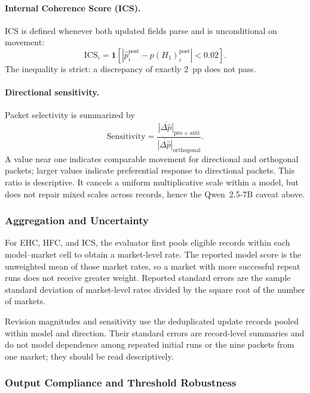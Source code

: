 \paragraph{Internal Coherence Score (ICS).}
ICS is defined whenever both updated fields parse and is unconditional on movement:
\begin{equation}
  \mathrm{ICS}_i=\mathbf{1}\!\left[
  \left|\hat p_i^{\mathrm{post}}-p(H_1)_i^{\mathrm{post}}\right|<0.02\right].
  \label{eq:ics}
\end{equation}
The inequality is strict: a discrepancy of exactly 2~pp does not pass.

\paragraph{Directional sensitivity.}
Packet selectivity is summarized by
\begin{equation}
  \mathrm{Sensitivity}=
  \frac{\overline{|\Delta\hat p|}_{\mathrm{pro}+\mathrm{anti}}}
       {\overline{|\Delta\hat p|}_{\mathrm{orthogonal}}}.
  \label{eq:sensitivity}
\end{equation}
A value near one indicates comparable movement for directional and orthogonal
packets; larger values indicate preferential response to directional packets. This
ratio is descriptive.  It cancels a uniform multiplicative scale within a model, but
does not repair mixed scales across records, hence the Qwen~2.5-7B caveat above.

\subsubsection{Aggregation and Uncertainty}
\label{app:aggregation}

For EHC, HFC, and ICS, the evaluator first pools eligible records within each
model--market cell to obtain a market-level rate.  The reported model score is the
unweighted mean of those market rates, so a market with more successful repeat runs
does not receive greater weight.  Reported standard errors are the sample standard
deviation of market-level rates divided by the square root of the number of markets.

Revision magnitudes and sensitivity use the deduplicated update records pooled
within model and direction. Their standard errors are record-level summaries and
do not model dependence among repeated initial runs or the nine packets from one
market; they should be read descriptively.

\subsubsection{Output Compliance and Threshold Robustness}
\label{app:exp1-threshold-robustness}

